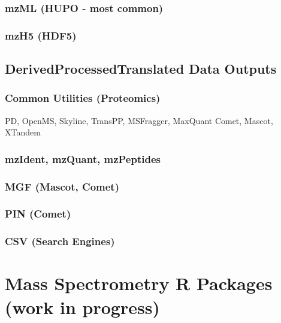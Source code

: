 \documentclass[
]{book}
\begin{document}
\hypertarget{mzml-hupo---most-common}{%
\subsection{mzML (HUPO - most common)}\label{mzml-hupo---most-common}}

\hypertarget{mzh5-hdf5}{%
\subsection{mzH5 (HDF5)}\label{mzh5-hdf5}}

\hypertarget{derivedprocessedtranslated-data-outputs}{%
\section{Derived\textbar Processed\textbar Translated Data Outputs}\label{derivedprocessedtranslated-data-outputs}}

\hypertarget{common-utilities-proteomics}{%
\subsection{Common Utilities (Proteomics)}\label{common-utilities-proteomics}}

PD, OpenMS, Skyline, TransPP, MSFragger, MaxQuant
Comet, Mascot, XTandem

\hypertarget{mzident-mzquant-mzpeptides}{%
\subsection{mzIdent, mzQuant, mzPeptides}\label{mzident-mzquant-mzpeptides}}

\hypertarget{mgf-mascot-comet}{%
\subsection{MGF (Mascot, Comet)}\label{mgf-mascot-comet}}

\hypertarget{pin-comet}{%
\subsection{PIN (Comet)}\label{pin-comet}}

\hypertarget{csv-search-engines}{%
\subsection{CSV (Search Engines)}\label{csv-search-engines}}

\hypertarget{mass-spectrometry-r-packages-work-in-progress}{%
\chapter{Mass Spectrometry R Packages (work in progress)}\label{mass-spectrometry-r-packages-work-in-progress}}
\end{document}
